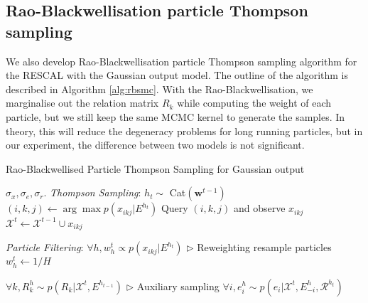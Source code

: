 \subsection*{Rao-Blackwellisation particle Thompson sampling}
We also develop Rao-Blackwellisation particle Thompson sampling algorithm for the RESCAL with the Gaussian output model. The outline of the algorithm is described in Algorithm \ref{alg:rbsmc}. With the Rao-Blackwellisation, we marginalise out the relation matrix $R_k$ while computing the weight of each particle, but we still keep the same MCMC kernel to generate the samples. In theory, this will reduce the degeneracy problems for long running particles, but in our experiment, the difference between two models is not significant.
\begin{algorithm}[t!]
   \caption{Rao-Blackwellised Particle Thompson Sampling for Gaussian output}
   \label{alg:rbsmc}
\begin{algorithmic}
    $\sigma_x, \sigma_e, \sigma_r$.
   \STATE \textit{Thompson Sampling}:
   \STATE $h_t \sim $ Cat$(\mathbf{w}^{t-1})$
   \STATE $(i,k,j) \leftarrow \arg\max p(x_{ikj}| E^{h_t})$   %
   \STATE Query $(i,k,j)$ and observe $x_{ikj}$
   \STATE $\mathcal{X}^{t} \leftarrow \mathcal{X}^{t-1} \cup x_{ikj}$

   \STATE \textit{Particle Filtering}:
   \STATE $\forall h, w_h^{t} \propto p(x_{ikj} | E^{h_t})$   \hfill $\triangleright$ Reweighting%
   \STATE resample particles
   \STATE $w_h^{t} \leftarrow 1/H$
   \ENDIF

   \STATE $\forall k, R_k^{h} \sim p(R_k | \mathcal{X}^{t}, E^{h_{t-1}})$   \hfill $\triangleright$ Auxiliary sampling%
   \STATE $\forall i, e^{h}_i \sim p(e_i | \mathcal{X}^{t}, E^{h}_{-i}, \mathcal{R}^{h_t})$ %
   \ENDFOR

   \ENDFOR
\end{algorithmic}
\end{algorithm}
